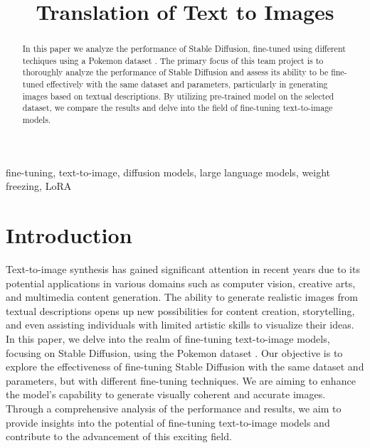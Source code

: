 \documentclass[conference]{IEEEtran}
\begin{document}
 \title{Translation of Text to Images} \author{  \and {} 
}
\maketitle

\begin{abstract}
In this paper we analyze the performance of Stable Diffusion, fine-tuned using different techiques using a Pokemon dataset \cite{pinkney2022pokemon}. The primary focus of this team project is to thoroughly analyze the performance of Stable Diffusion and assess its ability to be fine-tuned effectively with the same dataset and parameters, particularly in generating images based on textual descriptions. By utilizing pre-trained model on the selected dataset, we compare the results and delve into the field of fine-tuning text-to-image models.
\end{abstract}

\begin{IEEEkeywords}
fine-tuning, text-to-image, diffusion models, large language models, weight freezing, LoRA
\end{IEEEkeywords}

\section{Introduction}
Text-to-image synthesis has gained significant attention in recent years due to its potential applications in various domains such as computer vision, creative arts, and multimedia content generation. The ability to generate realistic images from textual descriptions opens up new possibilities for content creation, storytelling, and even assisting individuals with limited artistic skills to visualize their ideas. In this paper, we delve into the realm of fine-tuning text-to-image models, focusing on Stable Diffusion, using the Pokemon dataset \cite{pinkney2022pokemon}. Our objective is to explore the effectiveness of fine-tuning Stable Diffusion with the same dataset and parameters, but with different fine-tuning techniques. We are aiming to enhance the model's capability to generate visually coherent and accurate images. Through a comprehensive analysis of the performance and results, we aim to provide insights into the potential of fine-tuning text-to-image models and contribute to the advancement of this exciting field.
\end{document}
